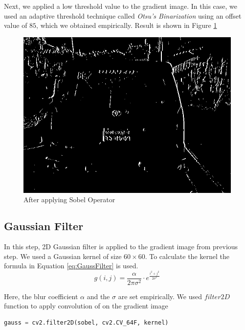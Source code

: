 \documentclass{standalone}
\begin{document}
Next, we applied a low threshold value to the gradient image. In this case, we used an adaptive threshold technique called {\it Otsu’s Binarization} using an offset value of $85$, which we obtained empirically. Result is shown in Figure \ref{fig:SobelSample}
\begin{figure}
	\centering
	\includegraphics[width=.8\linewidth]{./img/sample/stage2.jpg}
	\caption{After applying Sobel Operator} 
	\label{fig:SobelSample}
\end{figure}

\subsection{Gaussian Filter}
In this step, 2D Gaussian filter is applied to the gradient image from previous step. We used a Gaussian kernel of size $60 \times 60$. To calculate the kernel the formula in Equation \ref{eq:GaussFilter} is used.
\begin{equation} \label{eq:GaussFilter}
g(i, j) = \dfrac{\alpha}{2\pi\sigma^2} \cdot e^{\frac{i^2 + j^2}{2\sigma^2}}
\end{equation}

Here, the blur coefficient $\alpha$ and the $\sigma$ are set empirically. We used $filter2D$ function to apply convolution of on the gradient image
\begin{lstlisting}[language=Python]
gauss = cv2.filter2D(sobel, cv2.CV_64F, kernel)
\end{lstlisting}
\end{document}
